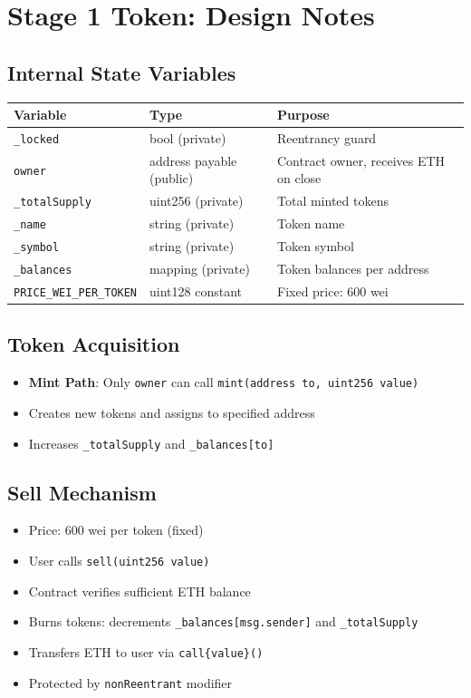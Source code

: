 \documentclass[10pt,a4paper]{article}
\begin{document}
\section{Stage 1 Token: Design Notes}

\subsection*{Internal State Variables}

\begin{table}[H]
\centering
\begin{tabularx}{\textwidth}{l l X}
\toprule
\textbf{Variable} & \textbf{Type} & \textbf{Purpose} \\
\midrule
\texttt{\_locked} & bool (private) & Reentrancy guard \\
\texttt{owner} & address payable (public) & Contract owner, receives ETH on close \\
\texttt{\_totalSupply} & uint256 (private) & Total minted tokens \\
\texttt{\_name} & string (private) & Token name \\
\texttt{\_symbol} & string (private) & Token symbol \\
\texttt{\_balances} & mapping (private) & Token balances per address \\
\texttt{PRICE\_WEI\_PER\_TOKEN} & uint128 constant & Fixed price: 600 wei \\
\bottomrule
\end{tabularx}
\end{table}

\subsection*{Token Acquisition}
\begin{itemize}
    \item \textbf{Mint Path}: Only \texttt{owner} can call \texttt{mint(address to, uint256 value)}
    \item Creates new tokens and assigns to specified address
    \item Increases \texttt{\_totalSupply} and \texttt{\_balances[to]}
\end{itemize}

\subsection*{Sell Mechanism}
\begin{itemize}
    \item Price: 600 wei per token (fixed)
    \item User calls \texttt{sell(uint256 value)}
    \item Contract verifies sufficient ETH balance
    \item Burns tokens: decrements \texttt{\_balances[msg.sender]} and \texttt{\_totalSupply}
    \item Transfers ETH to user via \texttt{call\{value\}()}
    \item Protected by \texttt{nonReentrant} modifier
\end{itemize}
\end{document}
